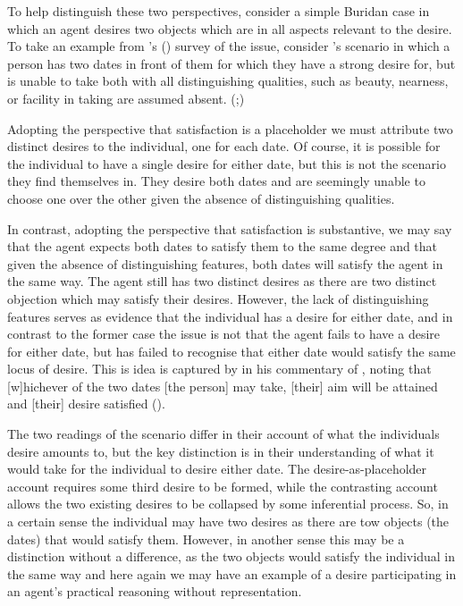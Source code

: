\documentclass[10pt]{article}
\begin{document}
To help distinguish these two perspectives, consider a simple Buridan case in which an agent desires two objects which are in all aspects relevant to the desire.
To take an example from \citeauthor{Rescher:1960aa}'s (\citeyear{Rescher:1960aa}) survey of the issue, consider \citeauthor{Al-Ghazali:1963aa}'s scenario in which a person has two dates in front of them for which they have a strong desire for, but is unable to take both with all distinguishing qualities, such as beauty, nearness, or facility in taking are assumed absent.
(\citeyear[26--27]{Al-Ghazali:1963aa};\citeyear[147--148]{Rescher:1960aa})

Adopting the perspective that satisfaction is a placeholder we must attribute two distinct desires to the individual, one for each date.
Of course, it is possible for the individual to have a single desire for either date, but this is not the scenario they find themselves in.
They desire both dates and are seemingly unable to choose one over the other given the absence of distinguishing qualities.

In contrast, adopting the perspective that satisfaction is substantive, we may say that the agent expects both dates to satisfy them to the same degree and that  given the absence of distinguishing features, both dates will satisfy the agent in the same way.
The agent still has two distinct desires as there are two distinct objection which may satisfy their desires.
However, the lack of distinguishing features serves as evidence that the individual has a desire for either date, and in contrast to the former case the issue is not that the agent fails to have a desire for either date, but has failed to recognise that either date would satisfy the same locus of desire.
This is idea is captured by \citeauthor{Averroes:1954aa} in his commentary of \citeauthor{Al-Ghazali:1963aa}, noting that [w]hichever of the two dates [the person] may take, [their] aim will be attained and [their] desire satisfied (\citeyear[23]{Averroes:1954aa}).

The two readings of the scenario differ in their account of what the individuals desire amounts to, but the key distinction is in their understanding of what it would take for the individual to desire either date.
The desire-as-placeholder account requires some third desire to be formed, while the contrasting account allows the two existing desires to be collapsed by some inferential process.
So, in a certain sense the individual may have two desires as there are tow objects (the dates) that would satisfy them.
However, in another sense this may be a distinction without a difference, as the two objects would satisfy the individual in the same way and here again we may have an example of a desire participating in an agent's practical reasoning without representation.
\end{document}
